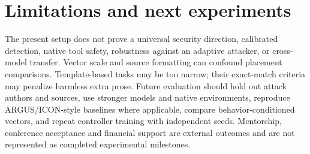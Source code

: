 \documentclass[11pt]{article}
\begin{document}

\section{Limitations and next experiments}
The present setup does not prove a universal security direction, calibrated detection,
native tool safety, robustness against an adaptive attacker, or cross-model transfer.
Vector scale and source formatting can confound placement comparisons. Template-based
tasks may be too narrow; their exact-match criteria may penalize harmless extra prose.
Future evaluation should hold out attack authors and sources, use stronger models and
native environments, reproduce ARGUS/ICON-style baselines where applicable, compare
behavior-conditioned vectors, and repeat controller training with independent seeds.
Mentorship, conference acceptance and financial support are external outcomes and are
not represented as completed experimental milestones.



\end{document}
